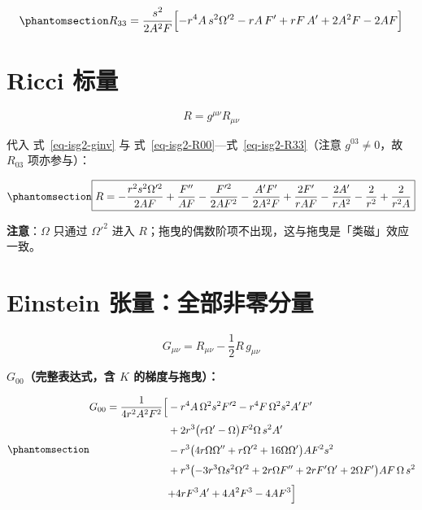 \documentclass[
  chinese,
  a4paper,
  UTF8,
  12pt,
  oneside,
  openany]{ctexbook}
\theoremstyle{plain}
\theoremstyle{plain}
\theoremstyle{plain}
\theoremstyle{definition}
\theoremstyle{plain}
\theoremstyle{plain}
\theoremstyle{remark}
\begin{document}
\begin{equation}\protect\phantomsection\label{eq-isg2-R33}{
R_{33}=\frac{s^{2}}{2A^{2}F}\Bigl[-r^{4}A\,s^{2}\Omega'^{2}-rA\,F'+rF\,A'+2A^{2}F-2AF\Bigr]
}\end{equation}

\section{Ricci 标量}\label{sec-isg2-R}

\[
R=g^{\mu\nu}R_{\mu\nu}
\]

代入 式~\ref{eq-isg2-ginv} 与
式~\ref{eq-isg2-R00}---式~\ref{eq-isg2-R33}（注意 \(g^{03}\neq0\)，故
\(R_{03}\) 项亦参与）：

\begin{equation}\protect\phantomsection\label{eq-isg2-Rscalar}{
\boxed{R=
-\frac{r^{2}s^{2}\Omega'^{2}}{2AF}
+\frac{F''}{AF}
-\frac{F'^{2}}{2AF^{2}}
-\frac{A'F'}{2A^{2}F}
+\frac{2F'}{rAF}
-\frac{2A'}{rA^{2}}
-\frac{2}{r^{2}}
+\frac{2}{r^{2}A}}
}\end{equation}

\textbf{注意}：\(\Omega\) 只通过 \(\Omega'^{2}\) 进入
\(R\)；拖曳的偶数阶项不出现，这与拖曳是「类磁」效应一致。

\section{Einstein 张量：全部非零分量}\label{sec-isg2-einstein}

\[
G_{\mu\nu}=R_{\mu\nu}-\frac{1}{2}R\,g_{\mu\nu}
\]

\textbf{\(G_{00}\)（完整表达式，含 \(K\) 的梯度与拖曳）：}

\begin{equation}\protect\phantomsection\label{eq-isg2-G00}{
\begin{aligned}
G_{00}=\frac{1}{4r^{2}A^{2}F^{2}}\Bigl[
&-r^{4}A\,\Omega^{2}s^{2}F'^{2}
-r^{4}F\,\Omega^{2}s^{2}A'F'\Bigr.\\[3pt]
&+2r^{3}\bigl(r\Omega'-\Omega\bigr)F^{2}\Omega\,s^{2}A'\\[3pt]
&-r^{3}\bigl(4r\Omega\Omega''+r\Omega'^{2}+16\Omega\Omega'\bigr)AF^{2}s^{2}\\[3pt]
&+r^{3}\bigl(-3r^{3}\Omega s^{2}\Omega'^{2}+2r\Omega F''+2rF'\Omega'+2\Omega F'\bigr)AF\,\Omega\,s^{2}\\[3pt]
&\Bigl.+4rF^{3}A'+4A^{2}F^{3}-4AF^{3}\Bigr]
\end{aligned}
}\end{equation}
\end{document}

